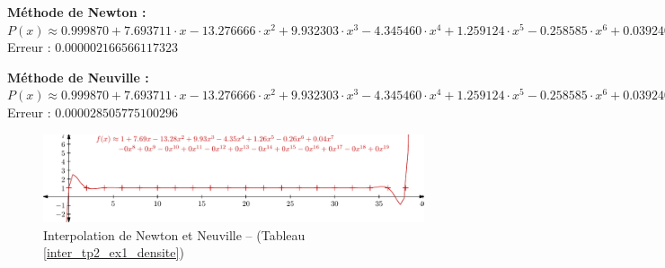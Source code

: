 \documentclass{report}
\begin{document}
	\noindent\textbf{Méthode de Newton :}\\
	$P(x) \approx 0.999870 + 7.693711 \cdot x - 13.276666 \cdot x^{2}  + 9.932303 \cdot x^{3} - 4.345460 \cdot x^{4}  + 1.259124 \cdot x^{5} - 0.258585 \cdot x^{6}  + 0.039240 \cdot x^{7} - 0.004520 \cdot x^{8}  + 0.000402 \cdot x^{9} - 0.000028 \cdot x^{10}  + 0.000002 \cdot x^{11} - 0.000000 \cdot x^{12}  + 0.000000 \cdot x^{13} - 0.000000 \cdot x^{14}  + 0.000000 \cdot x^{15} - 0.000000 \cdot x^{16}  + 0.000000 \cdot x^{17} - 0.000000 \cdot x^{18}  + 0.000000 \cdot x^{19} $\\
	Erreur : $0.000002166566117323$
	\newline
	
	\noindent\textbf{Méthode de Neuville :}\\
	$P(x) \approx 0.999870 + 7.693711 \cdot x- 13.276666 \cdot x^{2}  + 9.932303 \cdot x^{3} - 4.345460 \cdot x^{4}  + 1.259124 \cdot x^{5} - 0.258585 \cdot x^{6}  + 0.039240 \cdot x^{7} - 0.004520 \cdot x^{8}  + 0.000402 \cdot x^{9} - 0.000028 \cdot x^{10}  + 0.000002 \cdot x^{11} - 0.000000 \cdot x^{12}  + 0.000000 \cdot x^{13} - 0.000000 \cdot x^{14}  + 0.000000 \cdot x^{15} - 0.000000 \cdot x^{16}  + 0.000000 \cdot x^{17} - 0.000000 \cdot x^{18}  + 0.000000 \cdot x^{19} $\\
	Erreur : $0.000028505775100296$
	\newline
	\newline
		  
	\begin{figure}[h]
	  \centering
	  \includegraphics{graphiques/pdf_output/inter_tp2_ex1.pdf}
	  \caption{Interpolation de Newton et Neuville -- (Tableau \ref{inter_tp2_ex1_densite})}
	\end{figure}
      \newpage
    
\end{document}
